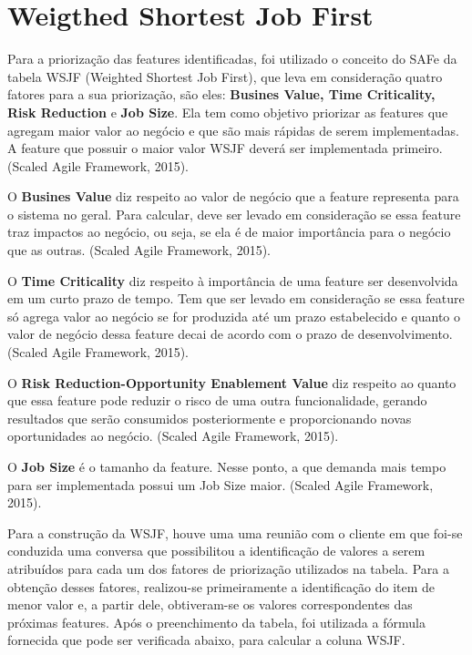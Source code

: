 \section{Weigthed Shortest Job First}
	
	Para a priorização das features identificadas, foi utilizado o conceito do SAFe da tabela WSJF (Weighted Shortest Job First), que leva em consideração quatro fatores para a sua priorização, são eles: \textbf{Busines Value, Time Criticality, Risk Reduction} e \textbf{Job Size}.  Ela tem como objetivo priorizar as features que agregam maior valor ao negócio e que são mais rápidas de serem implementadas. A feature que possuir o maior valor WSJF deverá ser implementada primeiro. (Scaled Agile Framework, 2015).

	O \textbf{Busines Value} diz respeito ao valor de negócio que a feature representa para o sistema no geral. Para calcular, deve ser levado em consideração se essa feature traz impactos ao negócio, ou seja, se ela é de maior importância para o negócio que as outras. (Scaled Agile Framework, 2015).

	O \textbf{Time Criticality} diz respeito à importância de uma feature ser desenvolvida em um curto prazo de tempo. Tem que ser levado em consideração se essa feature só agrega valor ao negócio se for produzida até um prazo estabelecido e quanto o valor de negócio dessa feature decai de acordo com o prazo de desenvolvimento. (Scaled Agile Framework, 2015).

	O \textbf{Risk Reduction-Opportunity Enablement Value} diz respeito ao quanto que essa feature pode reduzir o risco de uma outra funcionalidade, gerando resultados que serão consumidos posteriormente e proporcionando novas oportunidades ao negócio. (Scaled Agile Framework, 2015).

	O \textbf{Job Size} é o tamanho da feature. Nesse ponto, a que demanda mais tempo para ser implementada possui um Job Size maior. (Scaled Agile Framework, 2015).

	Para a construção da WSJF, houve uma uma reunião com o cliente em que foi-se conduzida uma conversa que possibilitou a identificação de valores a serem atribuídos para cada um dos fatores de priorização utilizados na tabela. Para a obtenção desses fatores, realizou-se primeiramente a identificação do item de menor valor e, a partir dele, obtiveram-se os valores correspondentes das próximas features. Após o preenchimento da tabela, foi utilizada a fórmula fornecida que pode ser verificada abaixo, para calcular a coluna WSJF.


